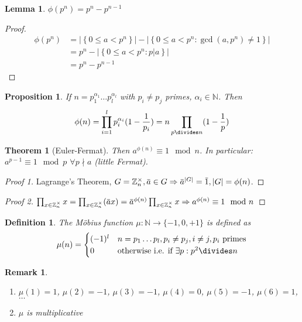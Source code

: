 \documentclass[a4paper]{article}
\newtheorem{defi}{Definition}
\newtheorem{rem}{Remark}
\newtheorem{lemma}{Lemma}
\newtheorem{theorem}{Theorem}
\newtheorem{prop}{Proposition}
\newcommand{\N}{\mathbb{N}}
\newcommand{\Z}{\mathbb{Z}}
\newcommand{\overbar}[1]{\mkern 1.5mu\overline{\mkern-1.5mu#1\mkern-1.5mu}\mkern 1.5mu}
\newcommand{\card}[1]{\left\vert{#1}\right\vert}
\newcommand{\set}[1]{\left\{#1\right\}}
\begin{document}
\begin{lemma}
  $\phi(p^n) = p^n - p^{n-1}$
\end{lemma}

\begin{proof}
  \begin{align*}
    \phi(p^n) &= \card{\set{0 \leq a < p^n}} - \card{\set{0 \leq a < p^n : \gcd(a,p^n) \neq 1}} \\
              &= p^n - \card{\set{0 \leq a < p^n : p|a}} \\
              &= p^n - p^{n-1}
  \end{align*}
\end{proof}

\begin{prop}
  If $n = p_1^{\alpha_1} \dots p_l^{\alpha_l}$ with $p_i \neq p_j$ primes, $\alpha_i \in \N$.
  Then
  \[ \phi(n) = \prod_{i=1}^l p_i^{\alpha_i} (1 - \frac{1}{p_i}) = n \prod_{p\divides n} (1 - \frac{1}{p}) \]
\end{prop}

\begin{theorem}[Euler-Fermat]
  Then $a^{\phi(n)} \equiv 1 \mod n$.
  In particular: $a^{p-1} \equiv 1 \mod p$ $\forall p \nmid a$ (little Fermat).
\end{theorem}

\begin{proof}[Proof 1]
  Lagrange's Theorem, $G = \Z_n^\times, \overbar{a} \in G \Rightarrow \overbar{a}^{|G|} = \overbar{1}, |G| = \phi(n)$.
\end{proof}

\begin{proof}[Proof 2]
  $\prod_{x \in \Z_n^\times} x = \prod_{x \in \Z_n^\times} (\overbar{a}x) = \overbar{a}^{\phi(n)} \prod_{x \in \Z_n^\times} x \Rightarrow a^{\phi(n)} \equiv 1 \mod n$ 
\end{proof}

\begin{defi}
  The Möbius function $\mu: \N \to \{-1,0,+1\}$ is defined as
  \[
	\mu(n) = \begin{cases}
	  (-1)^l & n = p_1 \dots p_l, p_i \neq p_j, i \neq j, p_i \text{ primes} \\
	  0       & \text{otherwise i.e. if } \exists p: p^2 \divides n
	\end{cases}
  \]
\end{defi}

\begin{rem}\hfill
  \begin{enumerate}
    \item $\mu(1) = 1$, $\mu(2) = -1$, $\mu(3) = -1$, $\mu(4) = 0$, $\mu(5) = -1$, $\mu(6) = 1$, $\dots$
    \item $\mu$ is \emph{multiplicative}
  \end{enumerate}
\end{rem}
\end{document}
